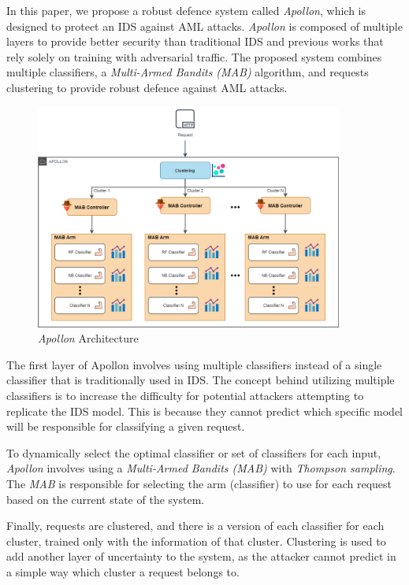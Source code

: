 In this paper, we propose a robust defence system called \textit{Apollon}, which is designed to protect an IDS against AML
attacks.
\textit{Apollon} is composed of multiple layers to provide better security than traditional IDS and previous works that rely
solely on training with adversarial traffic.
The proposed system combines multiple classifiers, a \textit{Multi-Armed Bandits (MAB)} algorithm, and requests clustering to
provide robust defence against AML attacks.

\begin{figure}
    \centering
    \includegraphics[width=0.9\textwidth]{Apollon.png}
    \caption{\textit{Apollon} Architecture}
    \label{fig:apollon-architecture}
\end{figure}


The first layer of Apollon involves using multiple classifiers instead of a single classifier that is traditionally
used in IDS.
The concept behind utilizing multiple classifiers is to increase the difficulty for potential attackers attempting to
replicate the IDS model.
This is because they cannot predict which specific model will be responsible for classifying a given request.

To dynamically select the optimal classifier or set of classifiers for each input, \textit{Apollon} involves using
a \textit{Multi-Armed Bandits (MAB)} with \textit{Thompson sampling}.
The \textit{MAB} is responsible for selecting the arm (classifier) to use for each request based on the current state of the
system.

Finally, requests are clustered, and there is a version of each classifier for each cluster, trained only with the
information of that cluster.
Clustering is used to add another layer of uncertainty to the system, as the attacker cannot predict in a simple way which
cluster a request belongs to.

